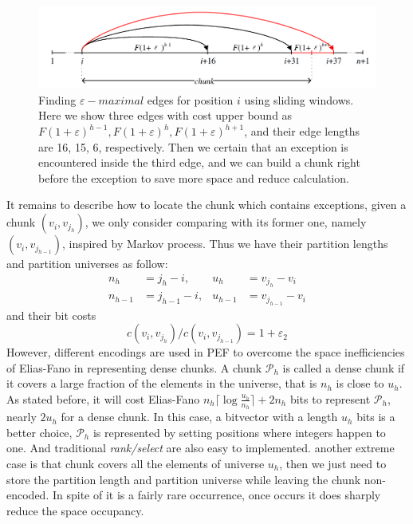 \documentclass[runningheads,a4paper]{llncs}
\begin{document}
\begin{figure}
	\centering
	\includegraphics[width=1.0\linewidth]{exception}
	\caption{Finding $\varepsilon-maximal$ edges for position $ i $ using sliding windows. Here we show three edges with cost upper bound as $ F(1+\varepsilon)^{h-1}, F(1+\varepsilon)^{h}, F(1+\varepsilon)^{h+1} $, and their edge lengths are 16, 15, 6, respectively. Then we certain that an exception is encountered inside the third edge, and we can build a chunk right before the exception to save more space and reduce calculation.}
	\label{fig:exceptions}
\end{figure}

It remains to describe how to locate the chunk which contains exceptions, given a chunk $\left(v_{i},v_{j_{h}}\right)$, we only consider comparing with its former one, namely $\left(v_{i},v_{j_{h-1}}\right)$, inspired by Markov process.
Thus we have their partition lengths and partition universes as follow:
\begin{align}
n_{h} &= j_{h}-i, & u_{h} &= v_{j_{h}} - v_{i} \label{equ: chunk h}\\
n_{h-1} &= j_{h-1}-i, &  u_{h-1} &= v_{j_{h-1}} - v_{i}\label{equ: chunk h-1}
\end{align}
and their bit costs
\begin{equation}\label{equ: cost ratio}
{c\left(v_{i},v_{j_{h}}\right)}/{c\left(v_{i},v_{j_{h-1}}\right)}=1+\varepsilon_{2}
\end{equation}
However, different encodings are used in PEF to overcome the space inefficiencies of Elias-Fano in representing dense chunks.
A chunk $ \mathcal{P}_{h} $ is called a dense chunk if it covers a large fraction of the elements in the universe, that is $ n_{h} $ is close to $ u_{h} $.
As stated before, it will cost Elias-Fano $ n_{h} \lceil \log \frac{u_{h}}{n_{h}} \rceil + 2 n_{h} $ bits to represent $ \mathcal{P}_{h} $, nearly $ 2 u_{h} $ for a dense chunk.
In this case, a bitvector with a length $ u_{h} $ bits is a better choice, $ \mathcal{P}_{h} $ is represented by setting positions where integers happen to one.
And traditional \textit{rank/select} are also easy to implemented.
another extreme case is that chunk covers all the elements of universe $ u_{h} $, then we just need to store the partition length and partition universe while leaving the chunk non-encoded.
In spite of it is a fairly rare occurrence, once occurs it does sharply reduce the space occupancy.
\end{document}
